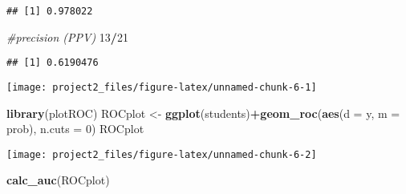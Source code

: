 \documentclass[]{article}
\newenvironment{Shaded}{\begin{snugshade}}{\end{snugshade}}
\newcommand{\CommentTok}[1]{\textcolor[rgb]{0.56,0.35,0.01}{\textit{#1}}}
\newcommand{\DataTypeTok}[1]{\textcolor[rgb]{0.13,0.29,0.53}{#1}}
\newcommand{\DecValTok}[1]{\textcolor[rgb]{0.00,0.00,0.81}{#1}}
\newcommand{\KeywordTok}[1]{\textcolor[rgb]{0.13,0.29,0.53}{\textbf{#1}}}
\newcommand{\NormalTok}[1]{#1}
\newcommand{\OperatorTok}[1]{\textcolor[rgb]{0.81,0.36,0.00}{\textbf{#1}}}
\newcommand{\StringTok}[1]{\textcolor[rgb]{0.31,0.60,0.02}{#1}}
\begin{document}
\begin{verbatim}
## [1] 0.978022
\end{verbatim}

\begin{Shaded}
\begin{Highlighting}[]
\CommentTok{#precision (PPV)}
\DecValTok{13}\OperatorTok{/}\DecValTok{21}
\end{Highlighting}
\end{Shaded}

\begin{verbatim}
## [1] 0.6190476
\end{verbatim}

\begin{Shaded}
\end{Shaded}

\begin{center}\texttt{[image: project2\_files/figure-latex/unnamed-chunk-6-1]} \end{center}

\begin{Shaded}
\begin{Highlighting}[]
\KeywordTok{library}\NormalTok{(plotROC)}
\NormalTok{ROCplot <-}\StringTok{ }\KeywordTok{ggplot}\NormalTok{(students)}\OperatorTok{+}\KeywordTok{geom_roc}\NormalTok{(}\KeywordTok{aes}\NormalTok{(}\DataTypeTok{d =}\NormalTok{ y, }\DataTypeTok{m =}\NormalTok{ prob), }\DataTypeTok{n.cuts =} \DecValTok{0}\NormalTok{)}
\NormalTok{ROCplot}
\end{Highlighting}
\end{Shaded}

\begin{center}\texttt{[image: project2\_files/figure-latex/unnamed-chunk-6-2]} \end{center}

\begin{Shaded}
\begin{Highlighting}[]
\KeywordTok{calc_auc}\NormalTok{(ROCplot)}
\end{Highlighting}
\end{Shaded}
\end{document}
